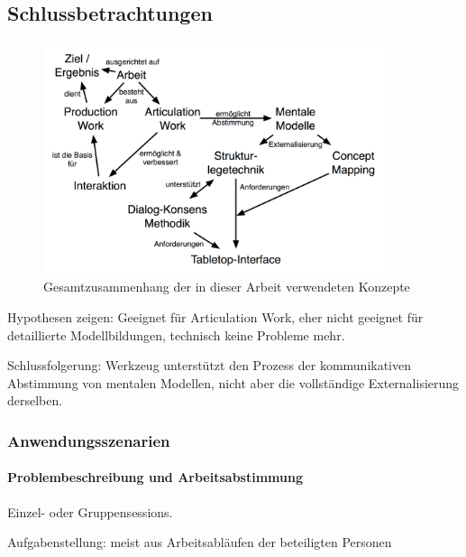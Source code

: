 \part*{}

\chapter{Schlussbetrachtungen} %
\label{cha:schlussbetrachtungen}

\begin{figure}[htbp]
	\centering
		\includegraphics[width=10cm]{img/Schlussbetrachtungen/ArbeitInteraktionMentaleModelleTabletop.png}
	\caption{Gesamtzusammenhang der in dieser Arbeit verwendeten Konzepte}
	\label{fig:img_Schlussbetrachtungen_ArbeitInteraktionMentaleModelleTabletop}
\end{figure}

Hypothesen zeigen: Geeignet für Articulation Work, eher nicht geeignet für detaillierte Modellbildungen, technisch keine Probleme mehr.

Schlussfolgerung: Werkzeug unterstützt den Prozess der kommunikativen Abstimmung von mentalen Modellen, nicht aber die vollständige Externalisierung derselben.

\section{Anwendungsszenarien} %
\label{sec:anwendungsszenarien}

\subsection{Problembeschreibung und Arbeitsabstimmung}

Einzel- oder Gruppensessions. 

Aufgabenstellung: meist aus Arbeitsabläufen der beteiligten Personen

